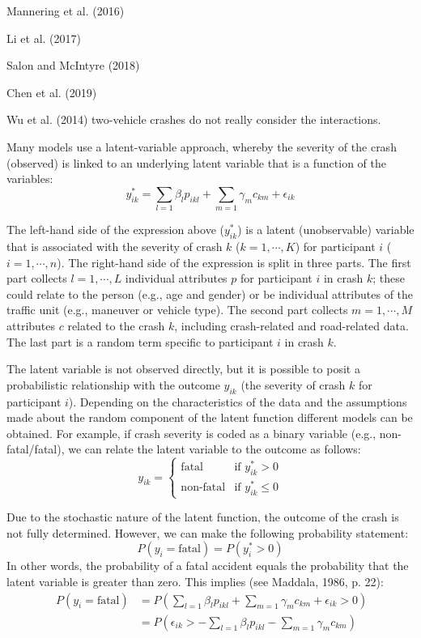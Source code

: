\documentclass[]{elsarticle} %
\begin{document}
Mannering et al. (2016)

Li et al. (2017)

Salon and McIntyre (2018)

Chen et al. (2019)

Wu et al. (2014) two-vehicle crashes do not really consider the
interactions.

Many models use a latent-variable approach, whereby the severity of the
crash (observed) is linked to an underlying latent variable that is a
function of the variables: \[
y_{ik}^*=\sum_{l=1}\beta_lp_{ikl} + \sum_{m=1}\gamma_mc_{km} + \epsilon_{ik}
\]

The left-hand side of the expression above (\(y_{ik}^*\)) is a latent
(unobservable) variable that is associated with the severity of crash
\(k\) (\(k=1,\cdots,K\)) for participant \(i\) (\(i = 1,\cdots,n\)). The
right-hand side of the expression is split in three parts. The first
part collects \(l=1,\cdots,L\) individual attributes \(p\) for
participant \(i\) in crash \(k\); these could relate to the person
(e.g., age and gender) or be individual attributes of the traffic unit
(e.g., maneuver or vehicle type). The second part collects
\(m=1,\cdots,M\) attributes \(c\) related to the crash \(k\), including
crash-related and road-related data. The last part is a random term
specific to participant \(i\) in crash \(k\).

The latent variable is not observed directly, but it is possible to
posit a probabilistic relationship with the outcome \(y_{ik}\) (the
severity of crash \(k\) for participant \(i\)). Depending on the
characteristics of the data and the assumptions made about the random
component of the latent function different models can be obtained. For
example, if crash severity is coded as a binary variable (e.g.,
non-fatal/fatal), we can relate the latent variable to the outcome as
follows: \[
y_{ik} = 
\begin{cases}
\text{fatal} & \text{if } y_{ik}^*>0\\
\text{non-fatal} & \text{if } y_{ik}^*\leq0
\end{cases}
\]

Due to the stochastic nature of the latent function, the outcome of the
crash is not fully determined. However, we can make the following
probability statement: \[
P(y_i = \text{fatal}) = P(y_i^* > 0)
\] In other words, the probability of a fatal accident equals the
probability that the latent variable is greater than zero. This implies
(see Maddala, 1986, p. 22): \[
\begin{array}{rl}\
P(y_i = \text{fatal}) &= P(\sum_{l=1}\beta_lp_{ikl} + \sum_{m=1}\gamma_mc_{km} + \epsilon_{ik} > 0)\\ 
&=P(\epsilon_{ik} > -\sum_{l=1}\beta_lp_{ikl} - \sum_{m=1}\gamma_mc_{km})
\end{array}
\]
\end{document}
